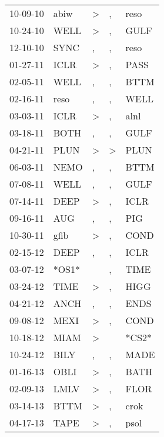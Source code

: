 \begin{supertabular}{lllll}
 10-09-10 &   abiw &     \textgreater &             , &   reso \\
 10-24-10 &   WELL &     \textgreater &             , &   GULF \\
 12-10-10 &   SYNC &                , &             , &   reso \\
 01-27-11 &   ICLR &     \textgreater &             , &   PASS \\
 02-05-11 &   WELL &                , &             , &   BTTM \\
 02-16-11 &   reso &                , &             , &   WELL \\
 03-03-11 &   ICLR &     \textgreater &             , &   alnl \\
 03-18-11 &   BOTH &                , &             , &   GULF \\
 04-21-11 &   PLUN &     \textgreater &  \textgreater &   PLUN \\
 06-03-11 &   NEMO &                , &             , &   BTTM \\
 07-08-11 &   WELL &                , &             , &   GULF \\
 07-14-11 &   DEEP &     \textgreater &             , &   ICLR \\
 09-16-11 &    AUG &                , &             , &    PIG \\
 10-30-11 &   gfib &     \textgreater &             , &   COND \\
 02-15-12 &   DEEP &                , &             , &   ICLR \\
 03-07-12 &  *OS1* &                  &             , &   TIME \\
 03-24-12 &   TIME &     \textgreater &             , &   HIGG \\
 04-21-12 &   ANCH &                , &             , &   ENDS \\
 09-08-12 &   MEXI &     \textgreater &             , &   COND \\
 10-18-12 &   MIAM &     \textgreater &               &  *CS2* \\
 10-24-12 &   BILY &                , &             , &   MADE \\
 01-16-13 &   OBLI &     \textgreater &             , &   BATH \\
 02-09-13 &   LMLV &     \textgreater &             , &   FLOR \\
 03-14-13 &   BTTM &     \textgreater &             , &   crok \\
 04-17-13 &   TAPE &     \textgreater &             , &   psol \\

\end{supertabular}
